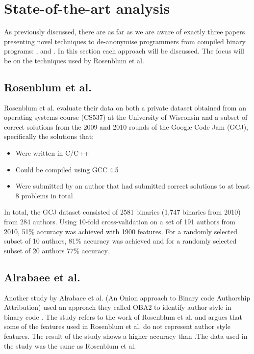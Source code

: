 \documentclass[a4paper,11pt]{kth-mag}
\begin{document}
\section{State-of-the-art analysis}
As previously discussed, there are as far as we are aware of exactly three
papers presenting novel techniques to de-anonymise programmers from compiled
binary programs: \parencite{rosenblum2011wrote}, \parencite{alrabaee2014oba2}
and \parencite{caliskan2015coding}. In this section each approach will be discussed.
The focus will be on the techniques used by Rosenblum et al.

\subsection{Rosenblum et al.}
Rosenblum et al. evaluate their data on both a private dataset obtained from
an operating systems course (CS537) at the University of Wisconsin and a subset
of correct solutions from the 2009 and 2010 rounds of the Google Code Jam
(GCJ), specifically the solutions that:

\begin{itemize}
\item Were written in C/C++
\item Could be compiled using GCC 4.5 
\item Were submitted by an author that had submitted correct solutions to at
      least 8 problems in total
\end{itemize}

In total, the GCJ dataset consisted of 2581 binaries (1,747 binaries from
2010) from 284 authors. Using 10-fold cross-validation on a set of 191 authors
from 2010, 51\% accuracy was achieved with 1900 features. For a randomly selected subset of 10
authors, 81\% accuracy was achieved and for a randomly selected subset of 20
authors 77\% accuracy.

\subsection{Alrabaee et al.}
Another study by Alrabaee et al. (An Onion approach to Binary code Authorship
Attribution) used an approach they called OBA2 to identify author style in
binary code \parencite{alrabaee2014oba2}. The study refers to the work of
Rosenblum et al. and argues that some of the features used in Rosenblum et al.
do not represent author style features. The result of the study
shows a higher accuracy than \parencite{rosenblum2011wrote}.The data used in
the study was the same as Rosenblum et al. 
\end{document}
